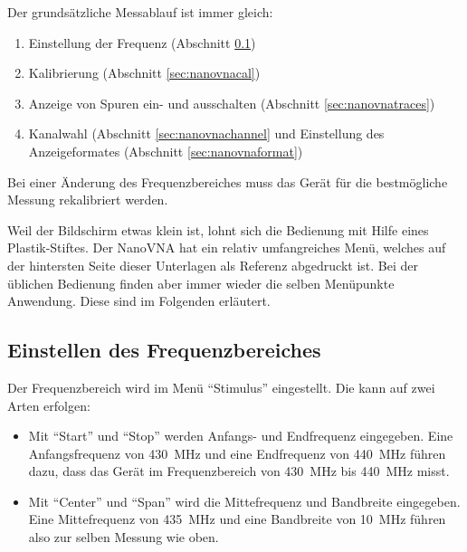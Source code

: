 \documentclass[twoside,a4paper,11pt,halfparskip,DIV=11,notitlepage]{scrartcl}
\begin{document}
Der grundsätzliche Messablauf ist immer gleich:

\begin{enumerate}
    \item Einstellung der Frequenz (Abschnitt \ref{sec:nanovnafreq})
    \item Kalibrierung (Abschnitt \ref{sec:nanovnacal})
    \item Anzeige von Spuren ein- und ausschalten (Abschnitt \ref{sec:nanovnatraces})
    \item Kanalwahl (Abschnitt \ref{sec:nanovnachannel} und Einstellung des Anzeigeformates
        (Abschnitt \ref{sec:nanovnaformat})
\end{enumerate}

Bei einer Änderung des Frequenzbereiches muss das Gerät für die bestmögliche Messung
rekalibriert werden.

Weil der Bildschirm etwas klein ist, lohnt sich die Bedienung mit Hilfe eines
Plastik-Stiftes. Der NanoVNA hat ein relativ umfangreiches Menü, welches auf der
hintersten Seite dieser Unterlagen als Referenz abgedruckt ist. Bei der
üblichen Bedienung finden aber immer wieder die selben Menüpunkte Anwendung.
Diese sind im Folgenden erläutert.

\subsection{Einstellen des Frequenzbereiches}\label{sec:nanovnafreq}

\begin{center}\end{center}


Der Frequenzbereich wird im Menü ``Stimulus'' eingestellt. Die kann auf zwei
Arten erfolgen:

\begin{itemize}
    \item Mit ``Start'' und ``Stop'' werden Anfangs- und Endfrequenz eingegeben. Eine Anfangsfrequenz von
        430~MHz und eine Endfrequenz von 440~MHz führen dazu, dass das  Gerät im Frequenzbereich von 430~MHz bis 440~MHz misst.
    \item Mit ``Center'' und ``Span'' wird die Mittefrequenz und Bandbreite eingegeben. Eine Mittefrequenz von 435~MHz
        und eine Bandbreite von 10~MHz führen also zur selben Messung wie oben.
\end{itemize}
\end{document}
